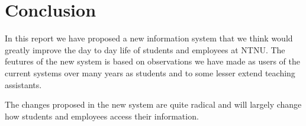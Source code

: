 \chapter{Conclusion}

In this report we have proposed a new information system that we think would greatly improve the day to day life of students and employees at NTNU. The feutures of the new system is based on observations we have made as users of the current systems over many years as students and to some lesser extend teaching assistants.

The changes proposed in the new system are quite radical and will largely change how students and employees access their information.

